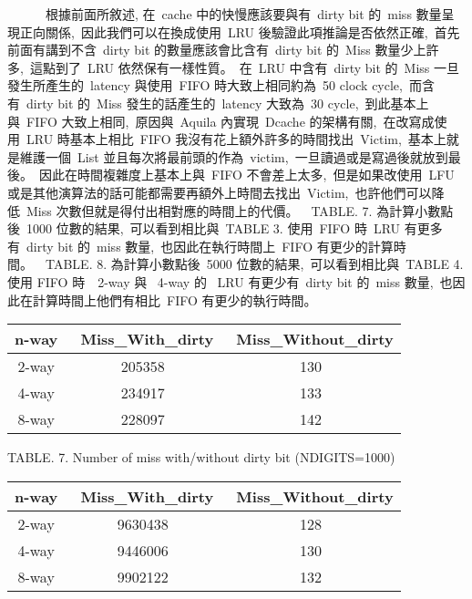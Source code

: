 \documentclass{article}
\begin{document}
\begin{CJK*}{UTF8}{bsmi}
\begin{multicols}{2}
\begin{flushleft}
    \ \ \ \ \ \ 根據前面所敘述, 在\ cache 中的快慢應該要與有\ dirty bit 的\ miss 數量呈現正向關係,\
    因此我們可以在換成使用\ LRU 後驗證此項推論是否依然正確,\
    首先前面有講到不含\ dirty bit 的數量應該會比含有\ dirty bit 的\ Miss 數量少上許多,\
    這點到了\ LRU 依然保有一樣性質。\
    在\ LRU 中含有\ dirty bit 的\ Miss 一旦發生所產生的\ latency 與使用\ FIFO 時大致上相同約為\ 50 clock cycle,\
    而含有\ dirty bit 的\ Miss 發生的話產生的\ latency 大致為\ 30 cycle,\
    到此基本上與\ FIFO 大致上相同,\
    原因與\ Aquila 內實現\ Dcache 的架構有關,\
    在改寫成使用\ LRU 時基本上相比\ FIFO 我沒有花上額外許多的時間找出\ Victim,\
    基本上就是維護一個\ List 並且每次將最前頭的作為\ victim,\
    一旦讀過或是寫過後就放到最後。\
    因此在時間複雜度上基本上與\ FIFO 不會差上太多,\
    但是如果改使用\ LFU 或是其他演算法的話可能都需要再額外上時間去找出\ Victim,\
    也許他們可以降低\ Miss 次數但就是得付出相對應的時間上的代價。\
    \ TABLE. 7. 為計算小數點後\ 1000 位數的結果,\
    可以看到相比與\ TABLE 3. 使用\ FIFO 時\ LRU 有更多有\ dirty bit 的\ miss 數量,\
    也因此在執行時間上\ FIFO 有更少的計算時間。\
    \ TABLE. 8. 為計算小數點後\ 5000 位數的結果,\
    可以看到相比與\ TABLE 4. 使用 FIFO 時\,
    \ 2-way 與 \ 4-way 的 \ LRU 有更少有\ dirty bit 的\ miss 數量,\
    也因此在計算時間上他們有相比\ FIFO 有更少的執行時間。\
\end{flushleft}


\begin{center}
    \begin{tabular}{|| c c c ||} 
     \hline
     n-way &  \ Miss\_With\_dirty & \ Miss\_Without\_dirty \\ [2ex] 
     \hline\hline
     2-way & 205358 & 130 \\ 
     \hline
     4-way & 234917 & 133 \\ 
     \hline
     8-way & 228097 & 142 \\ 
     \hline
    \end{tabular}
\end{center}

\begin{center}
    \footnotesize TABLE. 7. Number of miss with/without dirty bit  (NDIGITS=1000)
\end{center}


\begin{center}
    \begin{tabular}{|| c c c ||} 
     \hline
     n-way &  \ Miss\_With\_dirty & \ Miss\_Without\_dirty \\ [2ex] 
     \hline\hline
     2-way & 9630438 & 128 \\ 
     \hline
     4-way & 9446006 & 130  \\ 
     \hline
     8-way & 9902122 & 132 \\ 
     \hline
    \end{tabular}
\end{center}


\end{multicols}
\end{CJK*}
\end{document}
